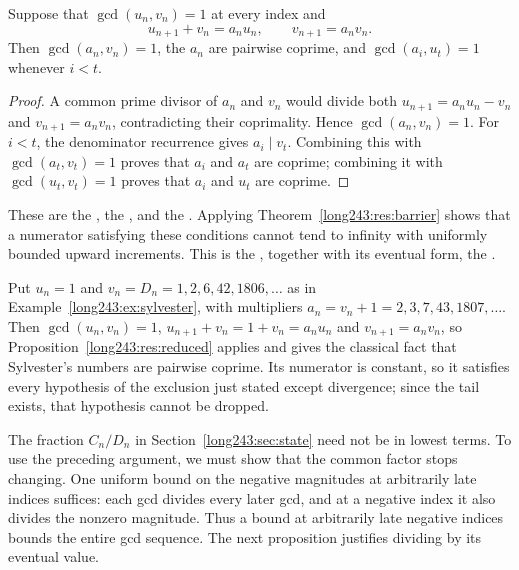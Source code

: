 \begin{proposition}\label{long243:res:reduced}
Suppose that $\gcd(u_n,v_n)=1$ at every index and
\[
 u_{n+1}+v_n=a_nu_n,\qquad v_{n+1}=a_nv_n.
\]
Then $\gcd(a_n,v_n)=1$, the $a_n$ are pairwise coprime, and
$\gcd(a_i,u_t)=1$ whenever $i<t$.
\end{proposition}

\begin{proof}
A common prime divisor of $a_n$ and $v_n$ would divide both
$u_{n+1}=a_nu_n-v_n$ and $v_{n+1}=a_nv_n$, contradicting their
coprimality. Hence $\gcd(a_n,v_n)=1$.
For $i<t$, the denominator recurrence gives $a_i\mid v_t$.
Combining this with $\gcd(a_t,v_t)=1$ proves that $a_i$ and $a_t$
are coprime; combining it with $\gcd(u_t,v_t)=1$ proves that $a_i$
and $u_t$ are coprime.
\end{proof}

\noindent These are the
, the
, and the
. Applying Theorem~\ref{long243:res:barrier}
shows that a numerator satisfying these conditions cannot tend to infinity
with uniformly bounded upward increments. This is the
, together with its eventual form, the
.

\begin{example}\label{long243:ex:reduced}
Put $u_n=1$ and $v_n=D_n=1,2,6,42,1806,\ldots$ as in
Example~\ref{long243:ex:sylvester}, with multipliers $a_n=v_n+1=2,3,7,43,1807,\ldots$.
Then $\gcd(u_n,v_n)=1$, $u_{n+1}+v_n=1+v_n=a_nu_n$ and $v_{n+1}=a_nv_n$, so
Proposition~\ref{long243:res:reduced} applies and gives the classical fact
that Sylvester's numbers are pairwise coprime.  Its numerator is
constant, so it satisfies every hypothesis of the exclusion just stated except
divergence; since the tail exists, that hypothesis cannot be dropped.
\end{example}

The fraction $C_n/D_n$ in Section~\ref{long243:sec:state} need not be in lowest terms.
To use the preceding argument, we must show that the common factor stops
changing. One uniform bound on the negative magnitudes at arbitrarily
late indices suffices: each gcd divides every later gcd, and at a negative
index it also divides the nonzero magnitude. Thus a bound at arbitrarily
late negative indices bounds the entire gcd sequence. The next proposition
justifies dividing by its eventual value.

